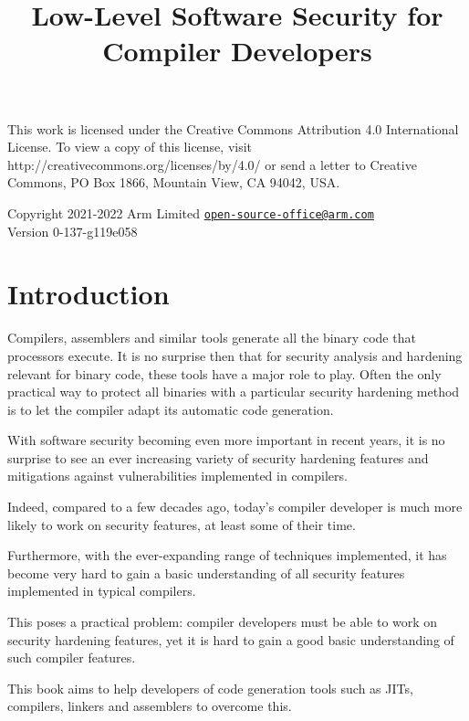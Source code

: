 \documentclass[a4paper,]{report}
\title{Low-Level Software Security for Compiler Developers}
\date{}
\begin{document}
\maketitle

\clearpage

\vspace*{\fill}
This work is licensed under the Creative Commons Attribution 4.0 International
License. To view a copy of this license, visit
http://creativecommons.org/licenses/by/4.0/ or send a letter to Creative
Commons, PO Box 1866, Mountain View, CA 94042, USA.

  Copyright 2021-2022 Arm Limited
  \href{mailto:open-source-office@arm.com}{\nolinkurl{open-source-office@arm.com}}\\

Version 0-137-g119e058
\clearpage

{
\hypersetup{linkcolor=}
\setcounter{tocdepth}{2}
\tableofcontents
}
\hypertarget{introduction}{%
\chapter{Introduction}\label{introduction}}

Compilers, assemblers and similar tools generate all the binary code
that processors execute. It is no surprise then that for security
analysis and hardening relevant for binary code, these tools have a
major role to play. Often the only practical way to protect all binaries
with a particular security hardening method is to let the compiler adapt
its automatic code generation.

With software security becoming even more important in recent years, it
is no surprise to see an ever increasing variety of security hardening
features and mitigations against vulnerabilities implemented in
compilers.

Indeed, compared to a few decades ago, today's compiler developer is
much more likely to work on security features, at least some of their
time.

Furthermore, with the ever-expanding range of techniques implemented, it
has become very hard to gain a basic understanding of all security
features implemented in typical compilers.

This poses a practical problem: compiler developers must be able to work
on security hardening features, yet it is hard to gain a good basic
understanding of such compiler features.

This book aims to help developers of code generation tools such as JITs,
compilers, linkers and assemblers to overcome this.
\end{document}
